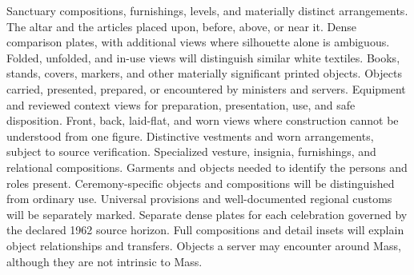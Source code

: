   {Sanctuary compositions, furnishings, levels, and materially distinct arrangements.}
  {The altar and the articles placed upon, before, above, or near it.}
  {Dense comparison plates, with additional views where silhouette alone is ambiguous.}
  {Folded, unfolded, and in-use views will distinguish similar white textiles.}
  {Books, stands, covers, markers, and other materially significant printed objects.}
  {Objects carried, presented, prepared, or encountered by ministers and servers.}
  {Equipment and reviewed context views for preparation, presentation, use, and safe disposition.}
  {Front, back, laid-flat, and worn views where construction cannot be understood from one figure.}
  {Distinctive vestments and worn arrangements, subject to source verification.}
  {Specialized vesture, insignia, furnishings, and relational compositions.}
  {Garments and objects needed to identify the persons and roles present.}
  {Ceremony-specific objects and compositions will be distinguished from ordinary use.}
  {Universal provisions and well-documented regional customs will be separately marked.}
  {Separate dense plates for each celebration governed by the declared 1962 source horizon.}
  {Full compositions and detail insets will explain object relationships and transfers.}
  {Objects a server may encounter around Mass, although they are not intrinsic to Mass.}


